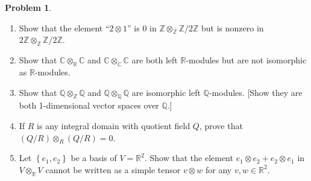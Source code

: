 \documentclass{amsart}
\numberwithin{equation}{section}
\theoremstyle{definition}
\newtheorem{problem}[thm]{Problem}
\begin{document}


\begin{problem}
  \begin{enumerate}
  \item Show that the element ``\(2 \otimes 1\)'' is 0 in \(\mathbb{Z} \otimes_{\mathbb{Z}} \mathbb{Z} / 2 \mathbb{Z}\) but is nonzero in \(2 \mathbb{Z} \otimes_{\mathbb{Z}} \mathbb{Z} / 2 \mathbb{Z}\).
  \item Show that \(\mathbb{C} \otimes_{\mathbb{R}} \mathbb{C}\) and \(\mathbb{C} \otimes_{\mathbb{C}} \mathbb{C}\) are both left \(\mathbb{R}\)-modules but are not isomorphic as \(\mathbb{R}\)-modules.
  \item Show that \(\mathbb{Q} \otimes_{\mathbb{Z}} \mathbb{Q}\) and \(\mathbb{Q} \otimes_{\mathbb{Q}} \mathbb{Q}\) are isomorphic left \(\mathbb{Q}\)-modules. [Show they are both 1-dimensional vector spaces over \(\mathbb{Q}\).]
  \item   If \(R\) is any integral domain with quotient field \(Q\), prove that \((Q / R) \otimes_R(Q / R)=0\).
  \item   Let \(\left\{e_1, e_2\right\}\) be a basis of \(V=\mathbb{R}^2\). Show that the element \(e_1 \otimes e_2+e_2 \otimes e_1\) in \(V \otimes_{\mathbb{R}} V\) cannot be written as a simple tensor \(v \otimes w\) for any \(v, w \in \mathbb{R}^2\).
  \end{enumerate}
\end{problem}
\end{document}
